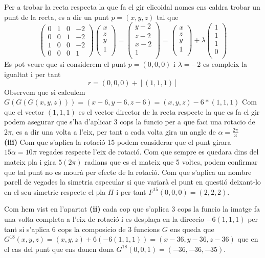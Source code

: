 \documentclass[12pt, a4papre]{article}
\begin{document}
	Per a trobar la recta respecta la que fa el gir elicoidal nomes ens caldra trobar un punt de la recta, es a dir un punt $p=(x,y,z)$ tal que 
	\[
	\begin{pmatrix}
		0	&	1	&	0	&	-2\\
		0	&	0	&	1	&	-2\\
		1	&	0  	&	0	&	-2\\
		0	&	0	& 	0	&	1
	\end{pmatrix}
	\begin{pmatrix}
		x\\
		z\\
		y\\
		1\\
	\end{pmatrix}
	=
	\begin{pmatrix}
		y-2\\
		z-2\\
		x-2\\
		1\\
	\end{pmatrix}
	=
	\begin{pmatrix}
		x\\
		z\\
		y\\
		1\\
	\end{pmatrix}
	+\lambda
	\begin{pmatrix}
		1\\
		1\\
		1\\
		0\\
	\end{pmatrix}
	\]
	Es pot veure que si considerem el punt $p=(0,0,0)$ i $\lambda=-2$ es compleix la igualtat i per tant 
	\[
	r=(0,0,0)+[(1,1,1)]
	\]
	Observem que si calculem $G(G(G(x,y,z)))=(x-6,y-6,z-6)=(x,y,z) - 6*(1,1,1)$ Com que el vector $(1,1,1)$ es el vector director de la recta respecte la que es fa
	el gir podem asegurar que s'ha d'aplicar 3 cops la funcio per a que faci una rotacio de $2\pi$, es a dir una volta a l'eix, per tant a cada volta gira un angle de 
	$\alpha=\frac{2\pi}{3}$
	\\
	
	\textbf{(iii)} 
	Com que s'aplica la rotació 15 podem considerar que el punt girara $15\alpha=10\pi$ 
	vegades respecte l'eix de rotació. Com que sempre es quedara dins del mateix pla i gira $5(2\pi)$ radians que es el mateix que 5 voltes, podem confirmar que tal punt no
	es mourà per efecte de la rotació. Com que s'aplica un nombre parell de vegades la simetria especular si que variarà el punt en questió deixant-lo en el seu simetric respecte el pla
	$\Pi$ i per tant $F^15(0,0,0)=(2,2,2)$.
	
	Com hem vist en l'apartat \textbf{(ii)} cada cop que s'aplica 3 cops la funcio la imatge fa una volta completa a l'eix de rotació i es desplaça en la direccio $-6(1,1,1)$
	per tant si s'aplica 6 cops la composicio de 3 funcions $G$ ens queda que $G^18(x,y,z)=(x,y,z)+6(-6(1,1,1))=(x-36, y-36, z-36)$ que en el cas del punt que ens donen
	dona $G^18(0,0,1)=(-36,-36,-35)$.

	
	
\end{document}
